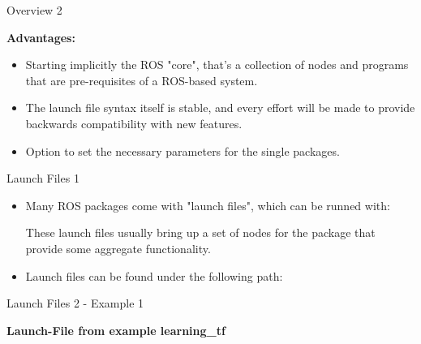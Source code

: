 \documentclass{beamer}
\begin{document}
\begin{frame}{Overview 2}
	\begin{large}
		\textbf{Advantages:} \newline
	\end{large}
\begin{itemize}
	\item Starting implicitly the ROS "core", that's a collection of nodes and programs that are pre-requisites of a ROS-based system.
	\newline
	\item The launch file syntax itself is stable, and every effort will be made to provide backwards compatibility with new features. 
	\newline
	\item Option to set the necessary parameters for the single packages. 
\end{itemize}
\end{frame}
\begin{frame}{Launch Files 1}
\begin{itemize}
 \item Many ROS packages come with "launch files", which can be runned with:
 \vspace{10px}
 
 \vspace{10px}
 These launch files usually bring up a set of nodes for the package that provide some aggregate functionality. 
\end{itemize}
\begin{itemize}
 \item Launch files can be found under the following path:
 \vspace{10px}
  
\end{itemize}
\end{frame}
\begin{frame}{Launch Files 2 - Example 1}
\begin{large}
	\textbf{Launch-File from example learning\_tf} 
\end{large}

\end{frame}
\end{document}
